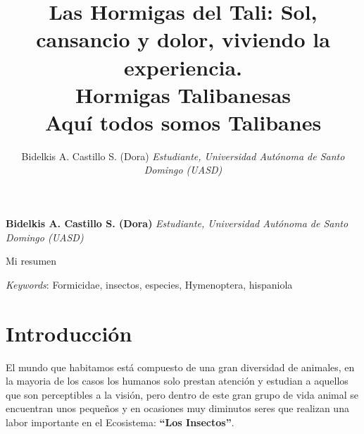 \documentclass[11pt,]{article}
\title{Las Hormigas del Tali: Sol, cansancio y dolor, viviendo la
experiencia.\\
Hormigas Talibanesas\\
Aquí todos somos Talibanes  }
\author{\Large Bidelkis A. Castillo S. (Dora)\vspace{0.05in} \newline\normalsize\emph{Estudiante, Universidad Autónoma de Santo Domingo (UASD)}  }
\date{}
\newcommand*{\authorfont}{\fontfamily{phv}\selectfont}
\renewenvironment{abstract}
 {{%
    \setlength{\leftmargin}{0mm}
    \setlength{\rightmargin}{\leftmargin}%
  }%
  \relax}
 {\endlist}
\begin{document}
	
%

{%
\setlength{\parindent}{0pt}
\thispagestyle{plain}
{\fontsize{18}{20}\selectfont\raggedright 
\maketitle  %

}

{
   \vskip 13.5pt\relax \normalsize\fontsize{11}{12} 
\textbf{\authorfont Bidelkis A. Castillo S. (Dora)} \hskip 15pt \emph{\small Estudiante, Universidad Autónoma de Santo Domingo (UASD)}   

}

}








\begin{abstract}

    \hbox{\vrule height .2pt width 39.14pc}

    \vskip 8.5pt %

\noindent Mi resumen


\vskip 8.5pt \noindent \emph{Keywords}: Formicidae, insectos, especies, Hymenoptera, hispaniola \par

    \hbox{\vrule height .2pt width 39.14pc}



\end{abstract}


\vskip 6.5pt


\noindent  \section{Introducción}\label{introducciuxf3n}

El mundo que habitamos está compuesto de una gran diversidad de
animales, en la mayoria de los casos los humanos solo prestan atención y
estudian a aquellos que son perceptibles a la visión, pero dentro de
este gran grupo de vida animal se encuentran unos pequeños y en
ocasiones muy diminutos seres que realizan una labor importante en el
Ecosistema: \textbf{``Los Insectos''}.
\end{document}
